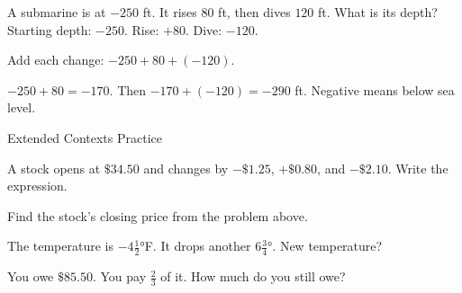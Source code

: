 \begin{stepExample}{A submarine is at $-250$ ft. It rises $80$ ft, then dives $120$ ft. What is its depth?}
     Starting depth: $-250$. Rise: $+80$. Dive: $-120$.

     Add each change: $-250 + 80 + (-120)$.

     $-250 + 80 = -170$. Then $-170 + (-120) = -290$ ft. Negative means below sea level.
\end{stepExample}


\newpage
\begin{stepPractice}{Extended Contexts Practice}
    \resetProblems

    \prob A stock opens at $\$34.50$ and changes by $-\$1.25$, $+\$0.80$, and $-\$2.10$. Write the expression. \answerBlank[4cm]

    \prob Find the stock's closing price from the problem above. \answerBlank[2cm]

    \prob The temperature is $-4\frac{1}{2}°$F. It drops another $6\frac{3}{4}°$. New temperature? \answerBlank[2.5cm]

    \prob You owe $\$85.50$. You pay $\frac{2}{3}$ of it. How much do you still owe? \answerBlank[2.5cm]

\end{stepPractice}
